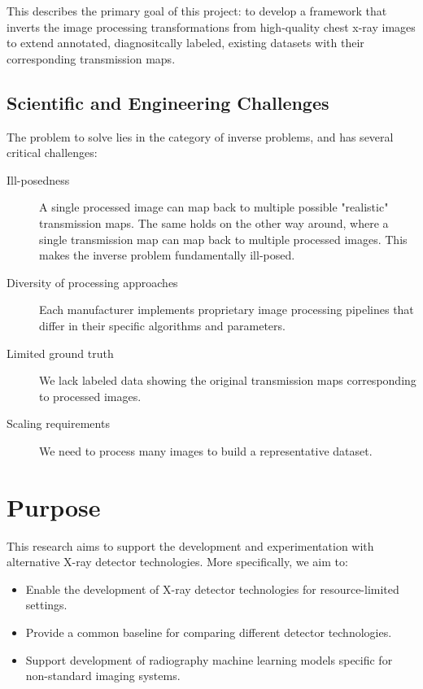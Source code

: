 \documentclass[nomenclature, english, bibtex]{kththesis}
\numberwithin{listing}{chapter}
\begin{document}
This describes the primary goal of this project: to develop a framework that inverts the image processing transformations
from high-quality chest x-ray images to extend annotated, diagnositcally labeled, existing datasets with
their corresponding transmission maps.


\subsection{Scientific and Engineering Challenges}

The problem to solve lies in the category of inverse problems, and has several critical challenges:

\begin{description}
    \item[Ill-posedness]
        A single processed image can map back to multiple possible "realistic" transmission maps.
        The same holds on the other way around, where a single transmission map can map back to multiple processed images.
       This makes the inverse problem fundamentally ill-posed.
    \item[Diversity of processing approaches]
        Each manufacturer implements proprietary image processing pipelines that differ in their specific algorithms and parameters.
    \item[Limited ground truth] We lack labeled data showing the original transmission maps corresponding to processed images.
    \item[Scaling requirements] We need to process many images to build a representative dataset.
\end{description}

\section{Purpose}

This research aims to support the development and experimentation with alternative X-ray detector technologies.
More specifically, we aim to:


\begin{itemize}
    \item Enable the development of X-ray detector technologies for resource-limited settings.
    \item Provide a common baseline for comparing different detector technologies.
    \item Support development of radiography machine learning models specific for non-standard imaging systems.
\end{itemize}
\end{document}
